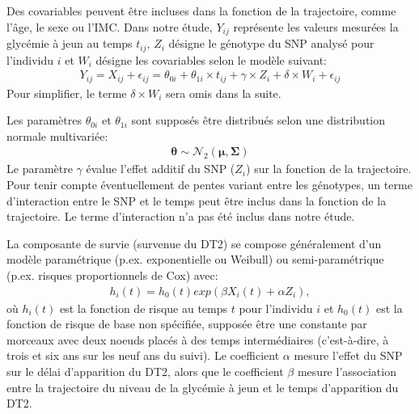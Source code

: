\documentclass[11pt, a4paper]{article}
\begin{document}
\par{Des covariables peuvent être incluses dans la fonction de la trajectoire, comme l'âge, le sexe ou l'IMC.
Dans notre étude, $Y_{ij}$ représente les valeurs mesurées la glycémie à jeun au temps $t_{ij}$, $Z_i$ désigne le génotype du SNP analysé pour l'individu $i$ et $W_i$ désigne les covariables selon le modèle suivant:
\begin{eqnarray}Y_{ij}=X_{ij}+\epsilon_{ij}=\theta_{0i}+\theta_{1i}\times t_{ij}+\gamma \times Z_i+\delta \times W_i + \epsilon_{ij}\label{eq:3}\end{eqnarray}
Pour simplifier, le terme $\delta \times W_i$ sera omis dans la suite.}

\par{Les paramètres $\theta_{0i}$ et $\theta_{1i}$ sont supposés être distribués selon une distribution normale multivariée:
\begin{eqnarray}\boldsymbol\theta \sim \mathcal{N}_2(\boldsymbol\mu, \boldsymbol\Sigma)\label{eq:4}\end{eqnarray}
Le paramètre $\gamma$ évalue l'effet additif du SNP ($Z_i$) sur la fonction de la trajectoire.
Pour tenir compte éventuellement de pentes variant entre les génotypes, un terme d'interaction entre le SNP et le temps peut être inclus dans la fonction de la trajectoire.
Le terme d'interaction n'a pas été inclus dans notre étude.}

\par{La composante de survie (survenue du DT2) se compose généralement d'un modèle paramétrique (p.ex. exponentielle ou Weibull) ou semi-paramétrique (p.ex. risques proportionnels de Cox) avec:
\begin{eqnarray}h_i(t)=h_0(t) exp(\beta X_i(t)+\alpha Z_i),\label{eq:5}\end{eqnarray}
où $h_i(t)$ est la fonction de risque au temps $t$ pour l'individu $i$ et $h_0(t)$ est la fonction de risque de base non spécifiée, supposée être une constante par morceaux avec deux noeuds placés à des temps intermédiaires
(c'est-à-dire, à trois et six ans sur les neuf ans du suivi). Le coefficient $\alpha$ mesure l'effet du SNP sur le délai d'apparition du DT2,
alors que le coefficient $\beta$ mesure l'association entre la trajectoire du niveau de la glycémie à jeun et le temps d'apparition du DT2.}

\clearpage
\end{document}
